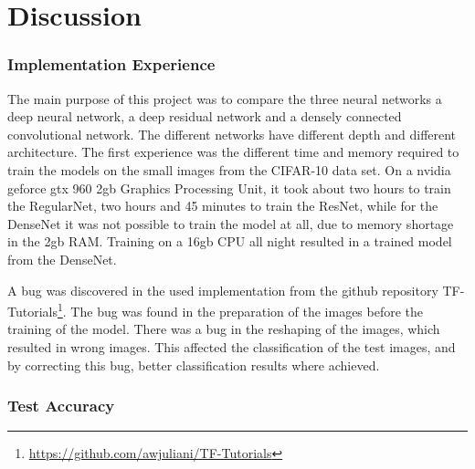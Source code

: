 \chapter{Discussion}
\label{chp:discussion}

\subsection{Implementation Experience}

The main purpose of this project was to compare the three neural networks a deep neural network, a deep residual network and a densely connected convolutional network. The different networks have different depth and different architecture. The first experience was the different time and memory required to train the models on the small images from the CIFAR-10 data set. On a nvidia geforce gtx 960 2gb Graphics Processing Unit, it took about two hours to train the RegularNet, two hours and 45 minutes to train the ResNet, while for the DenseNet it was not possible to train the model at all, due to memory shortage in the 2gb RAM. Training on a 16gb CPU all night resulted in a trained model from the DenseNet.

A bug was discovered in the used implementation from the github repository TF-Tutorials\footnote{\url{https://github.com/awjuliani/TF-Tutorials}}. The bug was found in the preparation of the images before the training of the model. There was a bug in the reshaping of the images, which resulted in wrong images. This affected the classification of the test images, and by correcting this bug, better classification results where achieved.

\subsection{Test Accuracy}

\FloatBarrier

